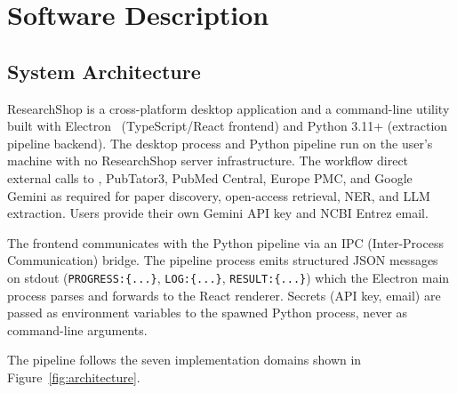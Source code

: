 \section{Software Description}
\label{sec:description}

\subsection{System Architecture}

ResearchShop is a cross-platform desktop application and a command-line utility built with Electron~\cite{electron_docs} (TypeScript/React frontend) and Python 3.11+ (extraction pipeline backend). The desktop process and Python pipeline run on the user's machine with no ResearchShop server infrastructure. The workflow \DIFdelbegin {}\DIFdelend{} \DIFaddbegin {}\DIFaddend{} direct external calls to \DIFdelbegin {}\DIFdelend{} \DIFaddbegin {}\cite{ncbi_eutilities_help}\DIFaddend , PubTator3, PubMed Central, Europe PMC, and Google Gemini as required for paper discovery, open-access retrieval, NER, and LLM extraction. Users provide their own Gemini API key and NCBI Entrez email.

The frontend communicates with the Python pipeline via an IPC (Inter-Process Communication) bridge. The pipeline process emits structured JSON messages on stdout (\texttt{PROGRESS:\{...\}}, \texttt{LOG:\{...\}}, \texttt{RESULT:\{...\}}) which the Electron main process parses and forwards to the React renderer. Secrets (API key, email) are passed as environment variables to the spawned Python process, never as command-line arguments.

The pipeline follows the seven implementation domains shown in Figure~\ref{fig:architecture}.

